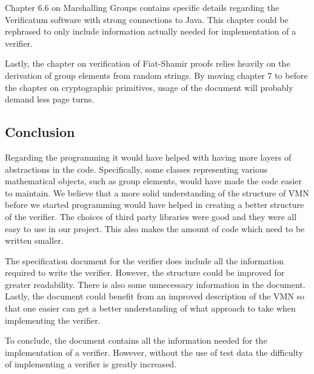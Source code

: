 Chapter 6.6 on Marshalling Groups contains specific details regarding
the Verificatum software with strong connections to Java. This chapter
could be rephrased to only include information actually needed for
implementation of a verifier.

Lastly, the chapter on verification of Fiat-Shamir proofs relies
heavily on the derivation of group elements from random strings. By
moving chapter 7 to before the chapter on cryptographic primitives,
usage of the document will probably demand less page turns.

\subsection{Conclusion}

Regarding the programming it would have helped with having more layers
of abstractions in the code. Specifically, some classes representing
various mathematical objects, such as group elements, would have made
the code easier to maintain. We believe that a more solid
understanding of the structure of VMN before we started programming
would have helped in creating a better structure of the verifier. The
choices of third party libraries were good and they were all easy to
use in our project. This also makes the amount of code which need to
be written smaller.

The specification document for the verifier does include all the
information required to write the verifier. However, the structure
could be improved for greater readability. There is also some
unnecessary information in the document. Lastly, the document could
benefit from an improved description of the VMN so that one easier can
get a better understanding of what approach to take when implementing
the verifier.

To conclude, the document contains all the information needed for the
implementation of a verifier. However, without the use of test data
the difficulty of implementing a verifier is greatly increased.



